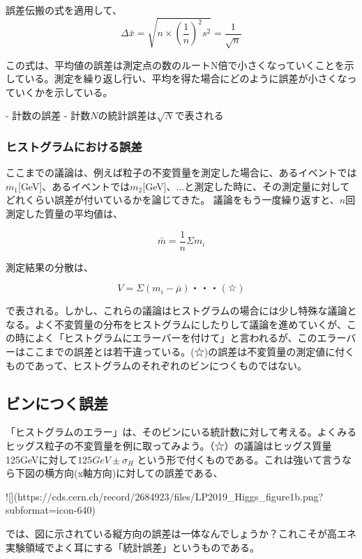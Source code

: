 \documentclass[a4paper,uplatex]{jsreport}
\begin{document}
誤差伝搬の式を適用して、
\begin{equation}
  \Delta \bar{x} = \sqrt{n\times\left(\frac{1}{n}\right)^2s^2}=\frac{1}{\sqrt{n}}
\end{equation}

この式は、平均値の誤差は測定点の数のルートN倍で小さくなっていくことを示している。測定を繰り返し行い、平均を得た場合にどのように誤差が小さくなっていくかを示している。

- 計数の誤差
- 計数$N$の統計誤差は$\sqrt{N}$で表される

\subsubsection{ヒストグラムにおける誤差}
ここまでの議論は、例えば粒子の不変質量を測定した場合に、あるイベントでは$m_1$[GeV]、あるイベントでは$m_2$[GeV]、...と測定した時に、その測定量に対してどれくらい誤差が付いているかを論じてきた。
議論をもう一度繰り返すと、$n$回測定した質量の平均値は、

\begin{equation}
  \bar{m}=\frac{1}{n}\Sigma m_i
\end{equation}

測定結果の分散は、

\begin{equation}
  V=\Sigma(m_i-\bar{\mu})・・・(☆)
\end{equation}

で表される。しかし、これらの議論はヒストグラムの場合には少し特殊な議論となる。よく不変質量の分布をヒストグラムにしたりして議論を進めていくが、この時によく「ヒストグラムにエラーバーを付けて」と言われるが、このエラーバーはここまでの誤差とは若干違っている。(☆)の誤差は不変質量の測定値に付くものであって、ヒストグラムのそれぞれのビンにつくものではない。

\subsection{ビンにつく誤差}
「ヒストグラムのエラー」は、そのビンにいる統計数に対して考える。よくみるヒッグス粒子の不変質量を例に取ってみよう。（☆）の議論はヒッグス質量125GeVに対して$125GeV \pm \sigma_{H}$ という形で付くものである。これは強いて言うなら下図の横方向(x軸方向)に対しての誤差である、

![](https://cds.cern.ch/record/2684923/files/LP2019_Higgs_figure1b.png?subformat=icon-640)

では、図に示されている縦方向の誤差は一体なんでしょうか？これこそが高エネ実験領域でよく耳にする「統計誤差」というものである。
\end{document}
